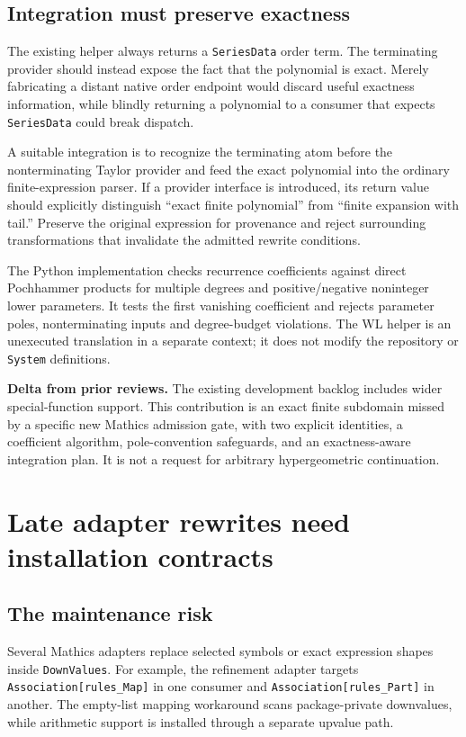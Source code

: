 \documentclass[11pt,letterpaper]{article}
\newcommand{\code}[1]{\nolinkurl{#1}}
\newcommand{\novelty}[1]{\par\textbf{Delta from prior reviews.} #1\par}
\begin{document}
\subsection{Integration must preserve exactness}
The existing helper always returns a \code{SeriesData} order term. The
terminating provider should instead expose the fact that the polynomial is
exact. Merely fabricating a distant native order endpoint would discard
useful exactness information, while blindly returning a polynomial to a
consumer that expects \code{SeriesData} could break dispatch.

A suitable integration is to recognize the terminating atom before the
nonterminating Taylor provider and feed the exact polynomial into the
ordinary finite-expression parser. If a provider interface is introduced,
its return value should explicitly distinguish ``exact finite polynomial''
from ``finite expansion with tail.'' Preserve the original expression for
provenance and reject surrounding transformations that invalidate the
admitted rewrite conditions.

The Python implementation checks recurrence coefficients against direct
Pochhammer products for multiple degrees and positive/negative noninteger
lower parameters. It tests the first vanishing coefficient and rejects
parameter poles, nonterminating inputs and degree-budget violations. The
WL helper is an unexecuted translation in a separate context; it does not
modify the repository or \code{System} definitions.

\novelty{The existing development backlog includes wider special-function
support. This contribution is an exact finite subdomain missed by a specific
new Mathics admission gate, with two explicit identities, a coefficient
algorithm, pole-convention safeguards, and an exactness-aware integration
plan. It is not a request for arbitrary hypergeometric continuation.}

\section{Late adapter rewrites need installation contracts}
\label{sec:rewrite}

\subsection{The maintenance risk}
Several Mathics adapters replace selected symbols or exact expression shapes
inside \code{DownValues}. For example, the refinement adapter targets
\code{Association[rules_Map]} in one consumer and
\code{Association[rules_Part]} in another. The empty-list mapping workaround
scans package-private downvalues, while arithmetic support is installed
through a separate upvalue path. \cite{repo-mrefinement,repo-mlists,repo-mformatting}
\end{document}
